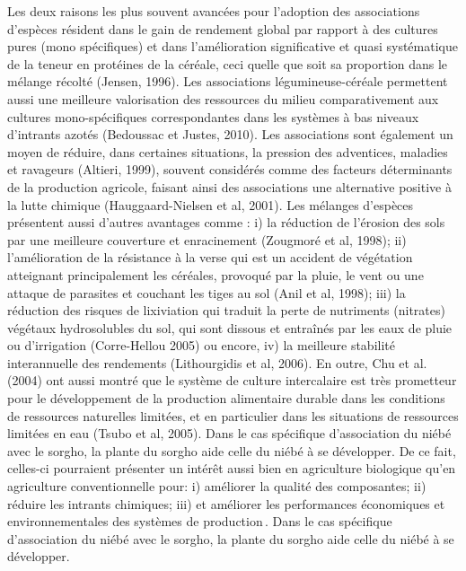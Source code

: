 \documentclass[a4paper,11pt]{article}
\begin{document}
Les deux raisons les plus souvent avancées pour l’adoption des
associations d’espèces résident dans le gain de rendement global par
rapport à des cultures pures (mono spécifiques) et dans l’amélioration
significative et quasi systématique de la teneur en protéines de la
céréale, ceci quelle que soit sa proportion dans le mélange récolté
(Jensen, 1996). Les associations légumineuse-céréale permettent aussi
une meilleure valorisation des ressources du milieu comparativement
aux cultures mono-spécifiques correspondantes dans les systèmes à bas
niveaux d’intrants azotés (Bedoussac et Justes, 2010). Les
associations sont également un moyen de réduire, dans certaines
situations, la pression des adventices, maladies et ravageurs
(Altieri, 1999), souvent considérés comme des facteurs déterminants de
la production agricole, faisant ainsi des associations une alternative
positive à la lutte chimique (Hauggaard-Nielsen et al, 2001). Les
mélanges d’espèces présentent aussi d’autres avantages comme : i) la
réduction de l’érosion des sols par une meilleure couverture et
enracinement (Zougmoré et al, 1998); ii) l’amélioration de la
résistance à la verse qui est un accident de végétation atteignant
principalement les céréales, provoqué par la pluie, le vent ou une
attaque de parasites et couchant les tiges au sol (Anil et al, 1998);
iii) la réduction des risques de lixiviation qui traduit la perte de
nutriments (nitrates) végétaux hydrosolubles du sol, qui sont dissous
et entraînés par les eaux de pluie ou d’irrigation (Corre-Hellou 2005)
ou encore, iv) la meilleure stabilité interannuelle des rendements
(Lithourgidis et al, 2006). En outre, Chu et al. (2004) ont aussi
montré que le système de culture intercalaire est très prometteur pour
le développement de la production alimentaire durable dans les
conditions de ressources naturelles limitées, et en particulier dans
les situations de ressources limitées en eau (Tsubo et al,
2005). Dans le cas spécifique d’association du niébé
avec le sorgho, la plante du sorgho aide celle du niébé à se
développer. De ce fait, celles-ci pourraient présenter un intérêt
aussi bien en agriculture biologique qu’en agriculture conventionnelle
pour: i) améliorer la qualité des composantes; ii) réduire les
intrants chimiques; iii) et améliorer les performances économiques et
environnementales des systèmes de
production\,\cite{Koulibi_FideleZONGO}. Dans le cas spécifique
d'association du niébé avec le sorgho, la plante du sorgho aide celle
du niébé à se développer.

\end{document}
